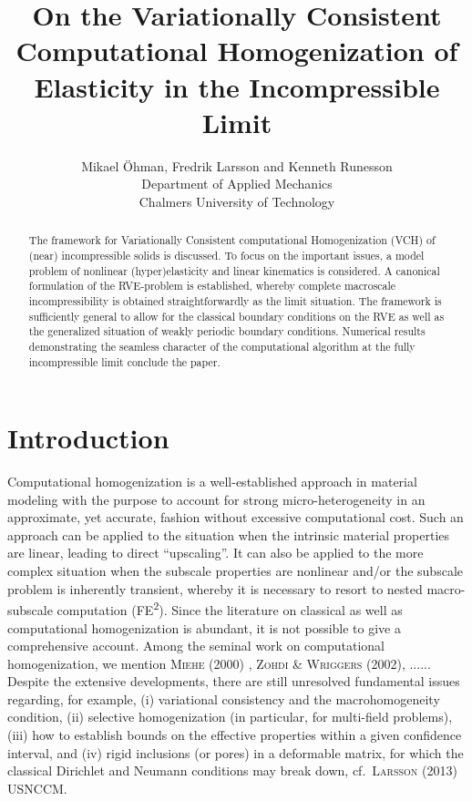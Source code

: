 \documentclass[12pt,a4paper]{article}
\title{On the Variationally Consistent Computational Homogenization of Elasticity in the Incompressible Limit}
\author{
Mikael Öhman, Fredrik Larsson and Kenneth Runesson\\
Department of Applied Mechanics \\
Chalmers University of Technology}
\begin{document}
\maketitle
\begin{abstract}
The framework for Variationally Consistent computational Homogenization (VCH) of (near) incompressible solids is discussed.
To focus on the important issues, a model problem of nonlinear (hyper)elasticity and linear kinematics is considered.
A canonical formulation of the RVE-problem is established, whereby complete macroscale incompressibility is obtained straightforwardly as the limit situation.
The framework is sufficiently general to allow for the classical boundary conditions on the RVE as well as the generalized situation of weakly periodic boundary conditions.
Numerical results demonstrating the seamless character of the computational algorithm at the fully incompressible limit conclude the paper.
\end{abstract}

\section{Introduction}

Computational homogenization is a well-established approach in material modeling with the purpose to account for strong micro-heterogeneity in an approximate, yet accurate, fashion without excessive computational cost.
Such an approach can be applied to the situation when the intrinsic material properties are linear, leading to direct ``upscaling''.
It can also be applied to the more complex situation when the subscale properties are nonlinear and/or the subscale problem is inherently transient, whereby it is necessary to resort to nested macro-subscale computation (FE\textsuperscript{2}).
Since the literature on classical as well as computational homogenization is abundant, it is not possible to give a comprehensive account.
Among the seminal work on computational homogenization, we mention \textsc{Miehe (2000)} \cite{Miehe2000}, \textsc{Zohdi \& Wriggers (2002)}, ......
Despite the extensive developments, there are still unresolved fundamental issues regarding, for example, (i) variational consistency and the macrohomogeneity condition, (ii) selective homogenization (in particular, for multi-field problems), (iii) how to establish bounds on the effective properties within a given confidence interval, and (iv) rigid inclusions (or pores) in a deformable matrix, for which the classical Dirichlet and Neumann conditions may break down, cf.\  \textsc{Larsson (2013)} \cite{Lar2013} USNCCM.
\end{document}
